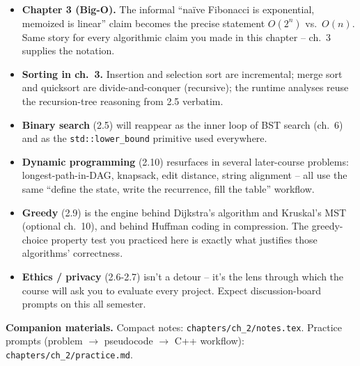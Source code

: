 \documentclass[11pt]{article}
\begin{document}
\begin{notebox}
\begin{itemize}
    \item \textbf{Chapter 3 (Big-O).} The informal ``na\"ive Fibonacci is
    exponential, memoized is linear'' claim becomes the precise
    statement $O(2^n)$ vs.\ $O(n)$. Same story for every algorithmic
    claim you made in this chapter -- ch.~3 supplies the notation.
    \item \textbf{Sorting in ch.~3.} Insertion and selection sort are
    incremental; merge sort and quicksort are divide-and-conquer
    (recursive); the runtime analyses reuse the recursion-tree reasoning
    from 2.5 verbatim.
    \item \textbf{Binary search} (2.5) will reappear as the inner loop
    of BST search (ch.~6) and as the \texttt{std::lower\_bound}
    primitive used everywhere.
    \item \textbf{Dynamic programming} (2.10) resurfaces in several
    later-course problems: longest-path-in-DAG, knapsack, edit
    distance, string alignment -- all use the same ``define the state,
    write the recurrence, fill the table'' workflow.
    \item \textbf{Greedy} (2.9) is the engine behind Dijkstra's algorithm
    and Kruskal's MST (optional ch.~10), and behind Huffman coding in
    compression. The greedy-choice property test you practiced here is
    exactly what justifies those algorithms' correctness.
    \item \textbf{Ethics / privacy} (2.6-2.7) isn't a detour -- it's the
    lens through which the course will ask you to evaluate every project.
    Expect discussion-board prompts on this all semester.
\end{itemize}
\end{notebox}

\textbf{Companion materials.} Compact notes:
\texttt{chapters/ch\_2/notes.tex}. Practice prompts (problem $\to$
pseudocode $\to$ C++ workflow): \texttt{chapters/ch\_2/practice.md}.
\end{document}
